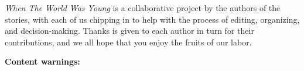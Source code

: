 \documentclass[11pt]{memoir}
\begin{document}
  \newpage

  

  \newpage
  \null
  \cleardoublepage
  \tableofcontents*
  \newpage
  \null
  \cleardoublepage

  \null
  \vfill
  
  \noindent\emph{When The World Was Young} is a collaborative project by the authors of the stories, with each of us chipping in to help with the process of editing, organizing, and decision-making. Thanks is given to each author in turn for their contributions, and we all hope that you enjoy the fruits of our labor.

  \vfill

  \textbf{Content warnings:}

  \mainmatter

  \pagestyle{ourbook}
  
  
  
  
	
	
	
	
	
	
	
	
	
	

  \backmatter
  \pagestyle{plain}

  
\end{document}
